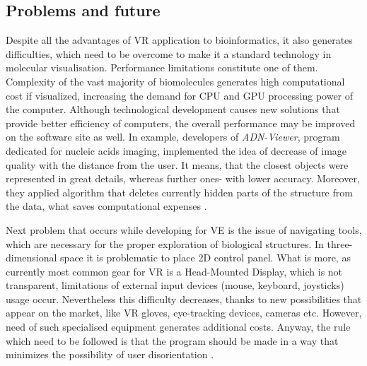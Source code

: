 \subsection{Problems and future}

Despite all the advantages of VR application to bioinformatics, it also generates difficulties, which need to be overcome to make it a standard technology in molecular visualisation. Performance limitations constitute one of them. Complexity of the vast majority of biomolecules generates high computational cost if visualized, increasing the demand for CPU and GPU processing power of the computer. Although technological development causes new solutions that provide better efficiency of computers, the overall performance may be improved on the software site as well. In example, developers of \textit{ADN-Viewer}, program dedicated for nucleic acids imaging, implemented the idea of decrease of image quality with the distance from the user. It means, that the closest objects were represented in great details, whereas further ones- with lower accuracy. Moreover, they applied algorithm that deletes currently hidden parts of the structure from the data, what saves computational expenses \citep{Anderson99}. 

Next problem that occurs while developing for VE is the issue of navigating tools, which are necessary for the proper exploration of biological structures. In three-dimensional space it is problematic to place 2D control panel. What is more, as currently most common gear for VR is a Head-Mounted Display, which is not transparent, limitations of external input devices (mouse, keyboard, joysticks) usage occur. Nevertheless this difficulty decreases, thanks to new possibilities that appear on the market, like VR gloves, eye-tracking devices, cameras etc. However, need of such specialised equipment generates additional costs. Anyway, the rule which need to be followed is that the program should be made in a way that minimizes the possibility of user disorientation \citep{Anderson99, Norrby15}.

